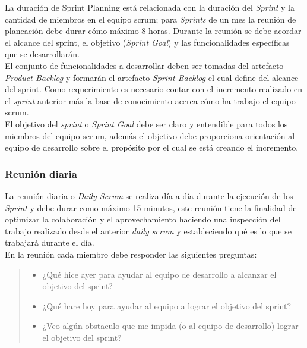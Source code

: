  \noindent La duración de Sprint Planning está relacionada con la duración del {\it Sprint} y la
 cantidad de miembros en el equipo scrum; para {\it Sprints} de un mes la reunión de planeación debe
 durar cómo máximo 8 horas. Durante la reunión se debe acordar el alcance del sprint, el objetivo
 ({\it Sprint Goal}) y las funcionalidades específicas que se desarrollarán.\\

 \noindent El conjunto de funcionalidades a desarrollar deben ser tomadas del artefacto {\it Product
 Backlog} y formarán el artefacto {\it Sprint Backlog} el cual define del alcance del sprint. Como
 requerimiento es necesario contar con el incremento realizado en el {\it sprint} anterior más la base
 de conocimiento acerca cómo ha trabajo el equipo scrum.\\
    
    
   
 \noindent El objetivo del {\it sprint} o {\it Sprint Goal} debe ser claro y entendible para todos los
 miembros del equipo scrum, además el objetivo debe proporciona orientación al equipo de desarrollo sobre
 el propósito por el cual se está creando el incremento.
  
\subsubsection{Reunión diaria}

 La reunión diaria o {\it Daily Scrum} se realiza día a día durante la ejecución de los {\it Sprint} y debe
 durar como máximo 15 minutos, este reunión tiene la finalidad de optimizar la colaboración y el aprovechamiento
 haciendo una inspección del trabajo realizado desde el anterior {\it daily scrum} y estableciendo qué es lo
 que se trabajará durante el día.\\

 En la reunión cada miembro debe responder las siguientes preguntas:
    
    \begin{quote}
    \begin{itemize}
    \item ¿Qué hice ayer para ayudar al equipo de desarrollo a alcanzar el objetivo del sprint?
    \item ¿Qué hare hoy para ayudar al equipo a lograr el objetivo del sprint?
    \item ¿Veo algún obstaculo que me impida (o al equipo de desarrollo) lograr el objetivo del sprint?
    \end{itemize}
    \end{quote} 

